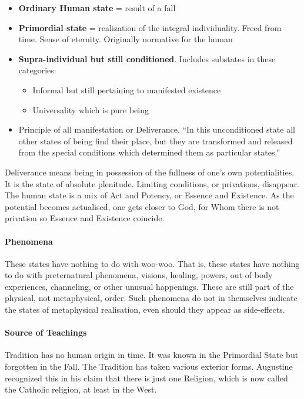 \begin{itemize}
\item \textbf{Ordinary Human state} = result of a fall 
\item \textbf{Primordial state} = realization of the integral individuality. Freed from time. Sense of eternity. Originally normative for the human 
\item \textbf{Supra-individual but still conditioned}. Includes substates in these categories: 

\begin{itemize}
\item Informal but still pertaining to manifested existence 
\item Universality which is pure being 
\end{itemize}
\item Principle of all manifestation or Deliverance. “In this unconditioned state all other states of being ﬁnd their place, but they are transformed and released from the special conditions which determined them as particular states.” 
\end{itemize}
Deliverance means being in possession of the fullness of one's own potentialities. It is the state of absolute plenitude. Limiting conditions, or privations, disappear. The human state is a mix of Act and Potency, or Essence and Existence. As the potential becomes actualised, one gets closer to God, for Whom there is not privation so Essence and Existence coincide.

\paragraph{Phenomena}
These states have nothing to do with woo-woo. That is, these states have nothing to do with preternatural phenomena, visions, healing, powers, out of body experiences, channeling, or other unusual happenings. These are still part of the physical, not metaphysical, order. Such phenomena do not in themselves indicate the states of metaphysical realisation, even should they appear as side-effects.

\paragraph{Source of Teachings}
Tradition has no human origin in time. It was known in the Primordial State but forgotten in the Fall. The Tradition has taken various exterior forms. Augustine recognized this in his claim that there is just one Religion, which is now called the Catholic religion, at least in the West.

